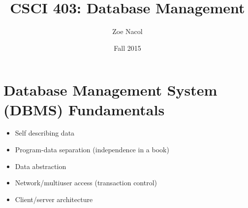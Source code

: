 \documentclass[12pt]{article}
\begin{document}
\author{Zoe Nacol}
\date{Fall 2015}
\title{CSCI 403: Database Management}
\maketitle
\section{Database Management System (DBMS) Fundamentals}
	\begin{itemize}
		\item
			Self describing data
		\item
			Program-data separation (independence in a book)
		\item
			Data abstraction
		\item
			Network/multiuser access (transaction control)
		\item
			Client/server architecture
	\end{itemize}
\end{document}
